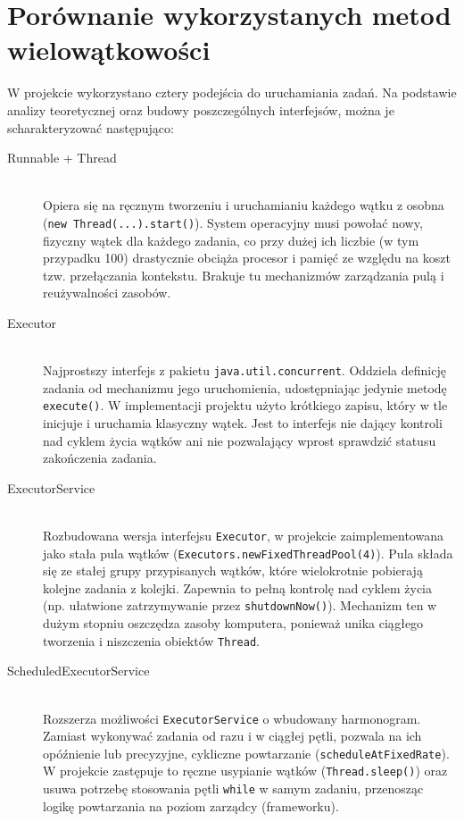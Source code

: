 \documentclass[11pt,a4paper]{article}
\begin{document}
\newpage\section{Porównanie wykorzystanych metod wielowątkowości}

W projekcie wykorzystano cztery podejścia do uruchamiania zadań. Na podstawie analizy teoretycznej oraz budowy poszczególnych interfejsów, można je scharakteryzować następująco:

\begin{description}
    \item[Runnable + Thread ] \hfill \\
    Opiera się na ręcznym tworzeniu i uruchamianiu każdego wątku z osobna (\texttt{new Thread(...).start()}). System operacyjny musi powołać nowy, fizyczny wątek dla każdego zadania, co przy dużej ich liczbie (w tym przypadku 100) drastycznie obciąża procesor i pamięć ze względu na koszt tzw. przełączania kontekstu. Brakuje tu mechanizmów zarządzania pulą i reużywalności zasobów.
    
    \item[Executor] \hfill \\
    Najprostszy interfejs z pakietu \texttt{java.util.concurrent}. Oddziela definicję zadania od mechanizmu jego uruchomienia, udostępniając jedynie metodę \texttt{execute()}. W implementacji projektu użyto krótkiego zapisu, który w tle inicjuje i uruchamia klasyczny wątek. Jest to interfejs nie dający kontroli nad cyklem życia wątków ani nie pozwalający wprost sprawdzić statusu zakończenia zadania.
    
    \item[ExecutorService] \hfill \\
    Rozbudowana wersja interfejsu \texttt{Executor}, w projekcie zaimplementowana jako stała pula wątków (\texttt{Executors.newFixedThreadPool(4)}). Pula składa się ze stałej grupy przypisanych wątków, które wielokrotnie pobierają kolejne zadania z kolejki. Zapewnia to pełną kontrolę nad cyklem życia (np. ułatwione zatrzymywanie przez \texttt{shutdownNow()}). Mechanizm ten w dużym stopniu oszczędza zasoby komputera, ponieważ unika ciągłego tworzenia i niszczenia obiektów \texttt{Thread}.
    
    \item[ScheduledExecutorService] \hfill \\
    Rozszerza możliwości \texttt{ExecutorService} o wbudowany harmonogram. Zamiast wykonywać zadania od razu i w ciągłej pętli, pozwala na ich opóźnienie lub precyzyjne, cykliczne powtarzanie (\texttt{scheduleAtFixedRate}). W projekcie zastępuje to ręczne usypianie wątków (\texttt{Thread.sleep()}) oraz usuwa potrzebę stosowania pętli \texttt{while} w samym zadaniu, przenosząc logikę powtarzania na poziom zarządcy (frameworku).
\end{description}
\end{document}

